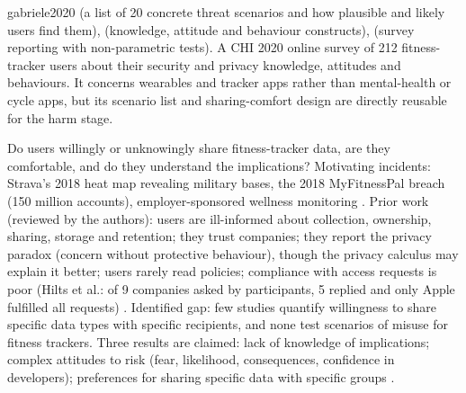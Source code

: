 \begin{papercard}{gabriele2020}
  (a list of 20 concrete threat scenarios and how plausible and likely users find them),  (knowledge, attitude and behaviour constructs),  (survey reporting with non-parametric tests). A CHI 2020 online survey of 212 fitness-tracker users about their security and privacy knowledge, attitudes and behaviours. It concerns wearables and tracker apps rather than mental-health or cycle apps, but its scenario list and sharing-comfort design are directly reusable for the harm stage.

 Do users willingly or unknowingly share fitness-tracker data, are they comfortable, and do they understand the implications?  Motivating incidents: Strava's 2018 heat map revealing military bases, the 2018 MyFitnessPal breach (150 million accounts), employer-sponsored wellness monitoring . Prior work (reviewed by the authors): users are ill-informed about collection, ownership, sharing, storage and retention; they trust companies; they report the privacy paradox (concern without protective behaviour), though the privacy calculus may explain it better; users rarely read policies; compliance with access requests is poor (Hilts et al.: of 9 companies asked by participants, 5 replied and only Apple fulfilled all requests) . Identified gap: few studies quantify willingness to share specific data types with specific recipients, and none test scenarios of misuse for fitness trackers. Three results are claimed: lack of knowledge of implications; complex attitudes to risk (fear, likelihood, consequences, confidence in developers); preferences for sharing specific data with specific groups .


\end{papercard}
